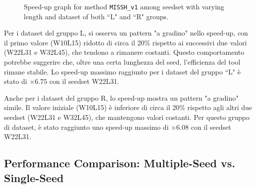 	\begin{figure}[!ht]
		\centering
		\caption{Speed-up graph for method \texttt{MISSH\_v1} among seedset with varying length and dataset of both “L" and “R" groups.}
		\label{fig:speedup-MISSH_v1-varying-length}
	\end{figure}
	
	
	Per i dataset del gruppo L, si osserva un pattern "a gradino" nello speed-up, con il primo valore (W10L15) ridotto di circa il 20\% rispetto ai successivi due valori (W22L31 e W32L45), che tendono a rimanere costanti. Questo comportamento potrebbe suggerire che, oltre una certa lunghezza del seed, l'efficienza del tool rimane stabile. Lo speed-up massimo raggiunto per i dataset del gruppo “L" è stato di $\times 6.75$ con il seedset W22L31.
	
	Anche per i dataset del gruppo R, lo speed-up mostra un pattern "a gradino" simile. Il valore iniziale (W10L15) è inferiore di circa il 20\% rispetto agli altri due seedset (W22L31 e W32L45), che mantengono valori costanti. Per questo gruppo di dataset, è stato raggiunto uno speed-up massimo di $\times 6.08$ con il seedset W22L31.




	\subsection{Performance Comparison: Multiple-Seed vs. Single-Seed}
	\label{subsec:performance-comparison-multi-vs-single-seed}
	

